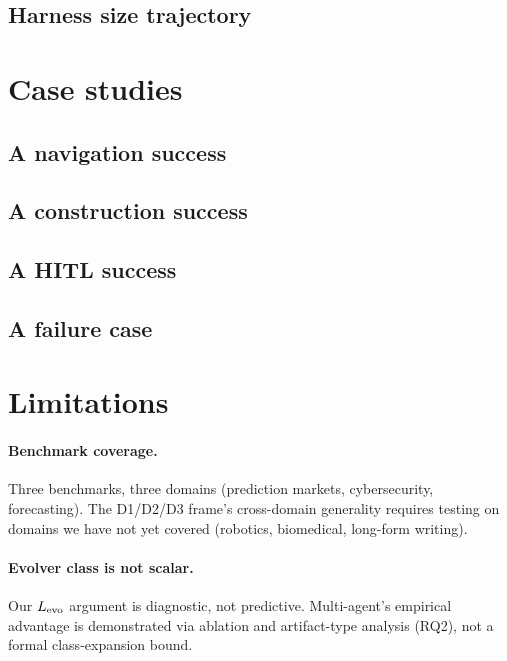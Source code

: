 \subsection{Harness size trajectory}

\section{Case studies}
\label{app:cases}

\subsection{A navigation success}

\subsection{A construction success}

\subsection{A HITL success}
\label{app:hitl_trace}

\subsection{A failure case}

\section{Limitations}
\label{app:limitations}

\paragraph{Benchmark coverage.} Three benchmarks, three domains (prediction markets, cybersecurity, forecasting). The D1/D2/D3 frame's cross-domain generality requires testing on domains we have not yet covered (robotics, biomedical, long-form writing).

\paragraph{Evolver class is not scalar.} Our $L_{\text{evo}}$ argument is diagnostic, not predictive. Multi-agent's empirical advantage is demonstrated via ablation and artifact-type analysis (RQ2), not a formal class-expansion bound.

